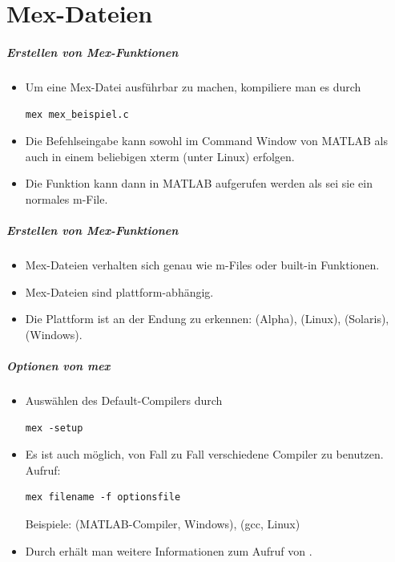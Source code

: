 \part{Mex-Dateien}
%
%
\begin{frame}[fragile]\frametitle{Erstellen von Mex-Funktionen}
\begin{itemize}
\item Um eine Mex-Datei  ausf\"uhrbar zu machen, kompiliere
man es durch 
\begin{lstlisting}
mex mex_beispiel.c
\end{lstlisting}
\item Die Befehlseingabe kann sowohl im Command Window von  MATLAB als auch in einem beliebigen
  xterm (unter Linux) erfolgen.
\item Die Funktion kann dann in MATLAB aufgerufen werden als sei sie ein normales
m-File.
\end{itemize}
\end{frame}
%
%
\begin{frame}[fragile]\frametitle{Erstellen von Mex-Funktionen}
\begin{itemize}
\item Mex-Dateien verhalten sich genau wie m-Files oder built-in Funktionen.
\item Mex-Dateien sind plattform-abh\"angig.
\item Die Plattform ist an der Endung zu erkennen:  (Alpha),
   (Linux),  (Solaris),  (Windows).
\end{itemize}
\end{frame}
%
%
\begin{frame}[fragile]\frametitle{Optionen von mex}
\begin{itemize}
\item Ausw\"ahlen des Default-Compilers durch
\begin{lstlisting}
mex -setup
\end{lstlisting}
\item Es ist auch m\"oglich, von Fall zu Fall verschiedene Compiler zu
  benutzen. Aufruf:
\begin{lstlisting}
mex filename -f optionsfile
\end{lstlisting}
Beispiele:  (MATLAB-Compiler, Windows),
 (gcc, Linux) 
\item Durch  erh\"alt man weitere Informationen zum Aufruf von .
\end{itemize}
\end{frame}
%

